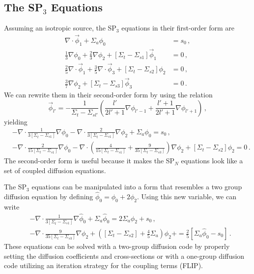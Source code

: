 \documentclass[12pt]{article}
\begin{document}
\subsection*{The SP$_3$ Equations}

Assuming an isotropic source, the SP$_3$ equations in their first-order form are
\begin{align*}
\nabla\cdot\vec{\phi}_1 + \Sigma_a\phi_0 &= s_0\,,\\
\frac{1}{3}\nabla\phi_0 + \frac{2}{3}\nabla\phi_2 + [\Sigma_t-\Sigma_{s1}]\vec{\phi}_1 &= 0\,,\\
\frac{2}{5}\nabla\cdot\vec{\phi}_1 + \frac{3}{5}\nabla\cdot\vec{\phi}_3 + [\Sigma_t-\Sigma_{s2}]\phi_2 &= 0\,,\\
\frac{3}{7}\nabla\phi_2 + [\Sigma_t-\Sigma_{s3}]\vec{\phi}_3 &= 0\,.
\end{align*}
We can rewrite them in their second-order form by using the relation
\[
\vec{\phi}_{l'} = -\frac{1}{\Sigma_t-\Sigma_{sl'}}\left(\frac{l'}{2l'+1}\nabla\phi_{l'-1}+\frac{l'+1}{2l'+1}\nabla\phi_{l'+1}\right)\,,
\]
yielding
\begin{align*}
&-\nabla \cdot \frac{1}{3[\Sigma_t-\Sigma_{s1}]}\nabla\phi_0
-\nabla \cdot \frac{2}{3[\Sigma_t-\Sigma_{s1}]}\nabla\phi_2
+\Sigma_a\phi_0 = s_0\,,\\
&-\nabla \cdot \frac{2}{15[\Sigma_t-\Sigma_{s1}]}\nabla\phi_0
-\nabla \cdot \left(\frac{4}{15[\Sigma_t-\Sigma_{s1}]}+\frac{9}{35[\Sigma_t-\Sigma_{s3}]}\right)\nabla\phi_2
+[\Sigma_t-\Sigma_{s2}]\phi_2 = 0\,.
 \end{align*}
The second-order form is useful because it makes the SP$_N$ equations look like a set of coupled diffusion equations. 

The SP$_3$ equations can be manipulated into a form that resembles a two group diffusion equation by defining $\hat\phi_0 = \phi_0+2\phi_2$.
Using this new variable, we can write
\begin{align*}
&-\nabla \cdot \frac{1}{3[\Sigma_t-\Sigma_{s1}]}\nabla\hat\phi_0
+\Sigma_a\hat\phi_0 = 2\Sigma_a\phi_2 + s_0\,,\\
&-\nabla \cdot \frac{9}{35[\Sigma_t-\Sigma_{s3}]}\nabla\phi_2
+ \left([\Sigma_t-\Sigma_{s2}]+\frac{4}{5}\Sigma_a\right)\phi_2
+ = \frac{2}{5}\left[\Sigma_a\hat\phi_0-s_0\right]\,.
 \end{align*}
These equations can be solved with a two-group diffusion code by properly setting the diffusion coefficients and cross-sections or with a one-group diffusion code utilizing an iteration strategy for the coupling terms (FLIP).
\end{document}

